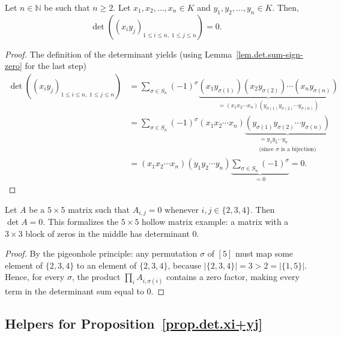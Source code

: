 \begin{proposition}
\label{prop.det.xiyj}
\leantarget
\leanok
Let $n \in \mathbb{N}$ be such that $n \geq 2$. Let
$x_1, x_2, \ldots, x_n \in K$ and $y_1, y_2, \ldots, y_n \in K$. Then,
\[
  \det\left( \left( x_i y_j \right)_{1 \leq i \leq n,\; 1 \leq j \leq n} \right) = 0.
\]
\end{proposition}

\begin{proof}
\leanok
The definition of the determinant yields
(using Lemma~\ref{lem.det.sum-sign-zero} for the last step)
\begin{align*}
  \det\left( \left( x_i y_j \right)_{1 \leq i \leq n,\; 1 \leq j \leq n} \right)
  &= \sum_{\sigma \in S_n} (-1)^{\sigma}
     \underbrace{(x_1 y_{\sigma(1)})(x_2 y_{\sigma(2)}) \cdots (x_n y_{\sigma(n)})}_{
       = (x_1 x_2 \cdots x_n)(y_{\sigma(1)} y_{\sigma(2)} \cdots y_{\sigma(n)})} \\
  &= \sum_{\sigma \in S_n} (-1)^{\sigma}
     (x_1 x_2 \cdots x_n)
     \underbrace{(y_{\sigma(1)} y_{\sigma(2)} \cdots y_{\sigma(n)})}_{\substack{
       = y_1 y_2 \cdots y_n \\
       \text{(since } \sigma \text{ is a bijection)}}} \\
  &= (x_1 x_2 \cdots x_n)(y_1 y_2 \cdots y_n)
     \underbrace{\sum_{\sigma \in S_n} (-1)^{\sigma}}_{= 0} = 0.
\end{align*}
\end{proof}

\begin{lemma}
\label{lem.det.hollow-core}
\leanhelper
\leanok
Let $A$ be a $5 \times 5$ matrix such that $A_{i,j} = 0$ whenever $i, j \in \{2, 3, 4\}$.
Then $\det A = 0$.
This formalizes the $5 \times 5$ hollow matrix example: a matrix with a
$3 \times 3$ block of zeros in the middle has determinant $0$.
\end{lemma}

\begin{proof}
\leanok
By the pigeonhole principle: any permutation $\sigma$ of $[5]$
must map some element of $\{2,3,4\}$ to an element of $\{2,3,4\}$, because
$|\{2,3,4\}| = 3 > 2 = |\{1,5\}|$.
Hence, for every $\sigma$, the product $\prod_i A_{i,\sigma(i)}$ contains a zero factor,
making every term in the determinant sum equal to $0$.
\end{proof}

\subsection{Helpers for Proposition~\ref{prop.det.xi+yj}}

